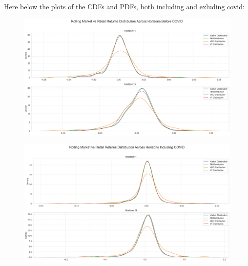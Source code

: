 Here below the plots of the CDFs and PDFs, both including and exluding covid:
\begin{figure}[H]
    \centering
    \includegraphics[width=1\linewidth]{Images/kdes_before_1_5.png}
\end{figure}
\begin{figure}[H]
    \centering
    \includegraphics[width=1\linewidth]{Images/kdes_including_1_5.png}
\end{figure}

